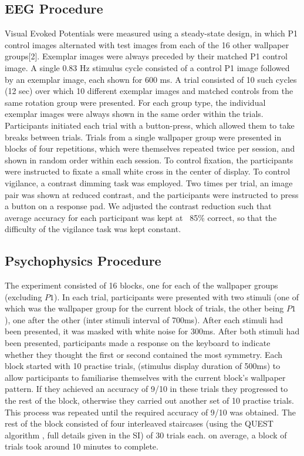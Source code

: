 \documentclass[9pt,twocolumn,twoside,lineno]{pnas-new}
\begin{document}
\subsection*{EEG Procedure}
Visual Evoked Potentials were measured using a steady-state design, in which P1 control images alternated with test images from each of the 16 other wallpaper groups[2]. Exemplar images were always preceded by their matched P1 control image. A single 0.83 Hz stimulus cycle consisted of a control P1 image followed by an exemplar image, each shown for 600 ms. A trial consisted of 10 such cycles (12 sec) over which 10 different exemplar images and matched controls from the same rotation group were presented. For each group type, the individual exemplar images were always shown in the same order within the trials. Participants initiated each trial with a button-press, which allowed them to take breaks between trials. Trials from a single wallpaper group were presented in blocks of four repetitions, which were themselves repeated twice per session, and shown in random order within each session. To control fixation, the participants were instructed to fixate a small white cross in the center of display. To control vigilance, a contrast dimming task was employed. Two times per trial, an image pair was shown at reduced contrast, and the participants were instructed to press a button on a response pad. We adjusted the contrast reduction such that average accuracy for each participant was kept at ~85\% correct, so that the difficulty of the vigilance task was kept constant.     

\subsection*{Psychophysics Procedure}
The experiment consisted of 16 blocks, one for each of the wallpaper groups (excluding $P1$). In each trial, participants were presented with two stimuli (one of which was the wallpaper group for the current block of trials, the other being $P1$), one after the other (inter stimuli interval of 700ms). After each stimuli had been presented, it was masked with white noise for 300ms. After both stimuli had been presented, participants made a response on the keyboard to indicate whether they thought the first or second contained the most symmetry. Each block started with 10 practise trials, (stimulus display duration of 500ms) to allow participants to familiarise themselves with the current block's wallpaper pattern. If they achieved an accuracy of 9/10 in these trials they progressed to the rest of the block, otherwise they carried out another set of 10 practise trials. This process was repeated until the required accuracy of 9/10 was obtained. The rest of the block consisted of four interleaved staircases (using the QUEST algorithm \cite{watson1983quest}, full details given in the SI) of 30 trials each. on average, a block of trials took around 10 minutes to complete. 
\end{document}
